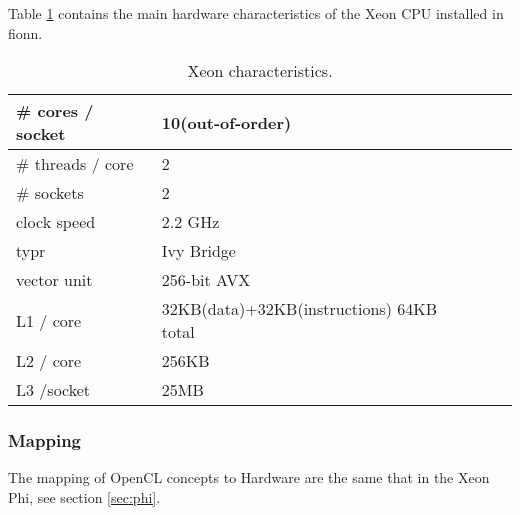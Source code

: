 \par{Table \ref{tab:xeon_arch} contains the main hardware characteristics of the Xeon CPU installed in fionn.}

\begin{table}[!h]
    \centering
    \begin{tabular}{| l | l | l | l |}
    \hline
    \# cores / socket& 10(out-of-order) \\ \hline
    \# threads / core& 2 \\ \hline
    \# sockets & 2 \\ \hline
    clock speed & 2.2 GHz \\ \hline
    typr & Ivy Bridge \\ \hline
    vector unit & 256-bit AVX \\ \hline
    L1 / core & 32KB(data)+32KB(instructions) 64KB total \\ \hline
    L2 / core & 256KB \\ \hline
    L3 /socket & 25MB \\ \hline
    \end{tabular}
    \caption{Xeon characteristics\cite{xeon_specs}.}
    \label{tab:xeon_arch}
\end{table}

\subsubsection{Mapping}

\par{The mapping of OpenCL concepts to Hardware are the same that in the Xeon Phi, see section \ref{sec:phi}.}
